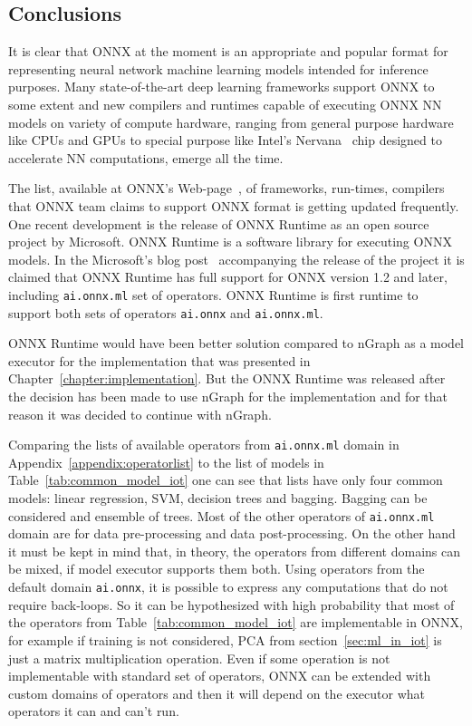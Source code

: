 \documentclass[english, 12pt, a4paper, elec, utf8, online]{aaltothesis}
\begin{document}
\subsection{Conclusions}
It is clear that ONNX at the moment is an appropriate and popular format for representing neural network machine learning models intended for inference purposes. Many state-of-the-art deep learning frameworks support ONNX to some extent and new compilers and runtimes capable of executing ONNX NN models on variety of compute hardware, ranging from general purpose hardware like CPUs and GPUs to special purpose like Intel's Nervana~\cite{cyphers2018intel} chip designed to accelerate NN computations, emerge all the time.

The list, available at ONNX's Web-page~\cite{onnx_tools}, of frameworks, run-times, compilers that ONNX team claims to support ONNX format is getting updated frequently. One recent development is the release of ONNX Runtime as an open source project by Microsoft. ONNX Runtime is a software library for executing ONNX models. In the Microsoft's blog post~\cite{onnx_runtime} accompanying the release of the project it is claimed that ONNX Runtime has full support for ONNX version 1.2 and later, including \texttt{ai.onnx.ml} set of operators.
ONNX Runtime is first runtime to support both sets of operators \texttt{ai.onnx} and \texttt{ai.onnx.ml}. 

ONNX Runtime would have been better solution compared to nGraph as a model executor for the implementation that was presented in Chapter~\ref{chapter:implementation}. But the ONNX Runtime was released after the decision has been made to use nGraph for the implementation and for that reason it was decided to continue with nGraph.

Comparing the lists of available operators from \texttt{ai.onnx.ml} domain in Appendix~\ref{appendix:operatorlist} to the list of models in Table~\ref{tab:common_model_iot} one can see that lists have only four common models: linear regression, SVM, decision trees and bagging. Bagging can be considered and ensemble of trees. Most of the other operators of \texttt{ai.onnx.ml} domain are for data pre-processing and data post-processing. On the  other hand it must be kept in mind that, in theory, the operators from different domains can be mixed, if model executor supports them both. Using operators from the default domain \texttt{ai.onnx}, it is possible to express any computations that do not require back-loops. So it can be hypothesized with high probability that most of the operators from Table~\ref{tab:common_model_iot} are implementable in ONNX, for example if training is not considered, PCA from section~\ref{sec:ml_in_iot} is just a matrix multiplication operation. Even if some operation is not implementable with standard set of operators, ONNX can be extended with custom domains of operators and then it will depend on the executor what operators it can and can't run. 
\end{document}
